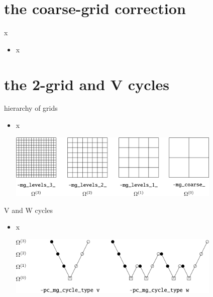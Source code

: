 \documentclass[10pt,
               svgnames,
               hyperref={colorlinks,citecolor=DeepPink4,linkcolor=FireBrick,urlcolor=Maroon},
               usepdftitle=false]{beamer}
\begin{document}
\section{the coarse-grid correction}

\begin{frame}{x}
\begin{itemize}
\item x
\end{itemize}
\end{frame}



\section{the 2-grid and V cycles}


\begin{frame}{hierarchy of grids}
\begin{itemize}
\item x

\hfill \includegraphics[width=0.8\textwidth]{images/multigrid-grids.png}
\end{itemize}
\end{frame}

\begin{frame}{V and W cycles}
\begin{itemize}
\item x

\hfill \includegraphics[width=0.8\textwidth]{images/multigrid-cycles.png}
\end{itemize}
\end{frame}
\end{document}

